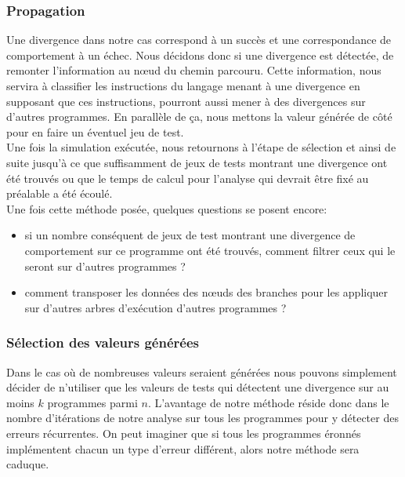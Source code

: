 \subsubsection*{Propagation}
Une divergence dans notre cas correspond à un succès et une correspondance de comportement à un échec. Nous décidons donc si une divergence est détectée, de remonter l'information  au nœud du chemin parcouru. Cette information, nous servira à classifier les instructions du langage menant à une divergence en supposant que ces instructions, pourront aussi mener à des divergences sur d'autres programmes. En parallèle de ça, nous mettons la valeur générée de côté pour en faire un éventuel jeu de test.\\

Une fois la simulation exécutée, nous retournons à l'étape de sélection et ainsi de suite jusqu'à ce que suffisamment de jeux de tests montrant une divergence ont été trouvés ou que le temps de calcul pour l'analyse qui devrait être fixé au préalable a été écoulé.\\

Une fois cette méthode posée, quelques questions se posent encore:
\begin{itemize}
\item si un nombre conséquent de jeux de test montrant une divergence de comportement sur ce programme ont été trouvés, comment filtrer ceux qui le seront sur d'autres programmes ?
\item comment transposer les données des nœuds des branches pour les appliquer sur d'autres arbres d'exécution d'autres programmes ?
\end{itemize}

\subsubsection*{Sélection des valeurs générées}
Dans le cas où de nombreuses valeurs seraient générées nous pouvons simplement décider de n'utiliser que les valeurs de tests qui détectent une divergence sur au moins $k$ programmes parmi $n$. L'avantage de notre méthode réside donc dans le nombre d'itérations de notre analyse sur tous les programmes pour y détecter des erreurs récurrentes. On peut imaginer que si tous les programmes éronnés implémentent chacun un type d'erreur différent, alors notre méthode sera caduque.

